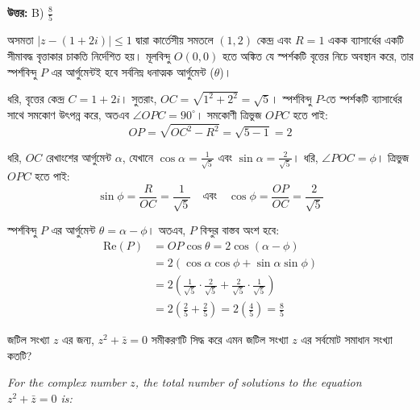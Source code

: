 \documentclass[12pt, a4paper]{article}
\begin{document}
\vspace{0.5em}
\begin{tcolorbox}[answerbox]
    \textbf{\color{success} উত্তর:} B) $\frac{8}{5}$
\end{tcolorbox}
\vspace{1em}

\begin{tcolorbox}[solutionbox={সমাধান (Solution)}]
    \noindent
    অসমতা $|z - (1+2i)| \leq 1$ দ্বারা কার্তেসীয় সমতলে $(1, 2)$ কেন্দ্র এবং $R = 1$ একক ব্যাসার্ধের একটি সীমাবদ্ধ বৃত্তাকার চাকতি নির্দেশিত হয়। মূলবিন্দু $O(0,0)$ হতে অঙ্কিত যে স্পর্শকটি বৃত্তের নিচে অবস্থান করে, তার স্পর্শবিন্দু $P$ এর আর্গুমেন্টই হবে সর্বনিম্ন ধনাত্মক আর্গুমেন্ট ($\theta$)। 
    
    \vspace{0.5em}
    ধরি, বৃত্তের কেন্দ্র $C = 1+2i$। সুতরাং, $OC = \sqrt{1^2 + 2^2} = \sqrt{5}$। স্পর্শবিন্দু $P$-তে স্পর্শকটি ব্যাসার্ধের সাথে সমকোণ উৎপন্ন করে, অতএব $\angle OPC = 90^\circ$। সমকোণী ত্রিভুজ $OPC$ হতে পাই:
    \[ OP = \sqrt{OC^2 - R^2} = \sqrt{5 - 1} = 2 \]
    
    \vspace{0.5em}
    ধরি, $OC$ রেখাংশের আর্গুমেন্ট $\alpha$, যেখানে $\cos\alpha = \frac{1}{\sqrt{5}}$ এবং $\sin\alpha = \frac{2}{\sqrt{5}}$। ধরি, $\angle POC = \phi$। ত্রিভুজ $OPC$ হতে পাই:
    \[ \sin\phi = \frac{R}{OC} = \frac{1}{\sqrt{5}} \quad \text{এবং} \quad \cos\phi = \frac{OP}{OC} = \frac{2}{\sqrt{5}} \]
    
    \vspace{0.5em}
    স্পর্শবিন্দু $P$ এর আর্গুমেন্ট $\theta = \alpha - \phi$। অতএব, $P$ বিন্দুর বাস্তব অংশ হবে:
    \begin{align*}
        \text{Re}(P) &= OP \cos\theta = 2 \cos(\alpha - \phi) \\
        &= 2 (\cos\alpha \cos\phi + \sin\alpha \sin\phi) \\
        &= 2 \left(\frac{1}{\sqrt{5}} \cdot \frac{2}{\sqrt{5}} + \frac{2}{\sqrt{5}} \cdot \frac{1}{\sqrt{5}}\right) \\
        &= 2 \left(\frac{2}{5} + \frac{2}{5}\right) = 2 \left(\frac{4}{5}\right) = \frac{8}{5}
    \end{align*}
\end{tcolorbox}

\begin{tcolorbox}[questionbox={প্রশ্ন (Question) 7}]
    \noindent
    জটিল সংখ্যা $z$ এর জন্য, $z^2 + \bar{z} = 0$ সমীকরণটি সিদ্ধ করে এমন জটিল সংখ্যা $z$ এর সর্বমোট সমাধান সংখ্যা কতটি?
    
    \vspace{0.8em}
    \begin{english}
    \noindent\textit{\color{darkgray}
    For the complex number $z$, the total number of solutions to the equation $z^2 + \bar{z} = 0$ is:
    }
    \end{english}
\end{tcolorbox}
\end{document}
